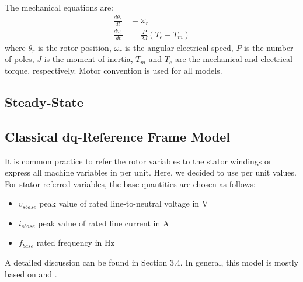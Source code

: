 The mechanical equations are:
%
\begin{align}
\frac{d\theta_r}{dt} &= \omega_r \label{eq:d_theta} \\
\frac{d\omega_r}{dt} &= \frac{P}{2J} (T_e-T_m) \label{eq:d_omega}
\end{align}
%
where $\theta_r$ is the rotor position, $\omega_r$ is the angular electrical speed, $P$ is the number of poles, $J$ is the moment of inertia, $T_m$ and $T_e$ are the mechanical and electrical torque, respectively. Motor convention is used for all models. 

\subsection{Steady-State}


\subsection{Classical dq-Reference Frame Model}

It is common practice to refer the rotor variables to the stator windings or express all machine variables in per unit. Here, we decided to use per unit values. For stator referred variables, the base quantities are chosen as follows:
%
\begin{itemize}
  \item $v_{s base}$ peak value of rated line-to-neutral voltage in V  
  \item $i_{s base}$ peak value of rated line current in A
  \item $f_{base}$ rated frequency in Hz
\end{itemize}
%
A detailed discussion can be found in \cite{kundur1994power} Section 3.4.
In general, this model is mostly based on \cite{kundur1994power} and \cite{krause2002}. 


